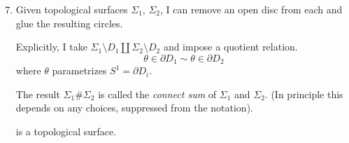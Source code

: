 \begin{enumerate}
    \setcounter{enumi}{6}
    \item Given topological surfaces \(\Sigma_1\), \(\Sigma_2\), I can remove an open disc from each and glue the resulting circles.

    Explicitly, I take \(\Sigma_{1}\setminus D_1\coprod \Sigma_2 \setminus D_2\) and impose a quotient relation. 
    \[
        \theta \in \partial D_1 \sim \theta \in \partial D_2
    \]
    where \(\theta\) parametrizes \(S^1 = \partial D_i\).

    The result \(\Sigma_1 \# \Sigma_2\) is called the \textit{connect sum} of \(\Sigma_1\) and \(\Sigma_2\). (In principle this depends on any choices, suppressed from the notation).

     is a topological surface.
\end{enumerate}